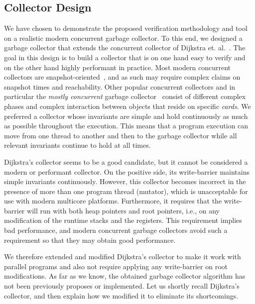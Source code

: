 \subsection{Collector Design}
We have chosen to demonstrate the proposed verification methodology and tool on a realistic modern concurrent garbage collector. To this end, we designed a garbage collector that extends the concurrent collector of Dijkstra et. al.~\cite{dijk78}. The goal in this design is to build a collector that is on one hand easy to verify and on the other hand highly performant in practice. Most modern concurrent collectors are snapshot-oriented~\cite{doli93,doli94,doma00,azat03}, and as such may require complex claims on snapshot times and reachability. Other popular concurrent collectors and in particular the {\em mostly concurrent} garbage collector~\cite{boeh91,prin00a,bara05} consist of different complex phases and complex interaction between objects that reside on specific {\em cards}. We preferred a collector whose invariants are simple and hold continuously as much as possible throughout the execution. This means that a program execution can move from one thread to another and then to the garbage collector while all relevant invariants continue to hold at all times. 

Dijkstra's collector seems to be a good candidate, but it cannot be considered a modern or performant collector. On the positive side, its write-barrier maintains simple invariants continuously. However, this collector becomes incorrect in the presence of more than one program thread (mutator), which is unacceptable for use with modern multicore platforms. Furthermore, it requires that the write-barrier will run with both heap pointers and root pointers, i.e., on any modification of the runtime stacks and the registers. This requirement implies bad performance, and modern concurrent garbage collectors avoid such a requirement so that they may obtain good performance. 

We therefore extended and modified Dijkstra's collector to make it work with parallel programs and also not require applying any write-barrier on root modifications. As far as we know, the obtained garbage collector algorithm has not been previously proposes or implemented. Let us shortly recall Dijkstra's collector, and then explain how we modified it to eliminate its shortcomings.  

